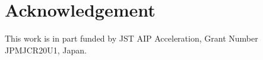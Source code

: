 \documentclass[nohyperref]{article}
\theoremstyle{plain}
\theoremstyle{definition}
\theoremstyle{remark}
\begin{document}
\section*{Acknowledgement}
This work is in part funded by JST AIP Acceleration, Grant Number JPMJCR20U1, Japan.








\newpage
\appendix


\end{document}
